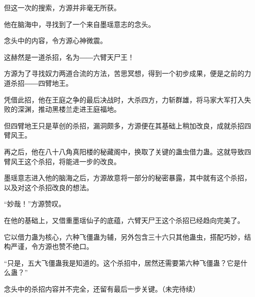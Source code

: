 \begin{this_body}
但这一次的搜索，方源并非毫无所获。

他在脑海中，寻找到了一个来自墨瑶意志的念头。

念头中的内容，令方源心神微震。

这赫然是一道杀招，名为――六臂天尸王！

方源为了寻找奴力两道合流的方法，苦思冥想，得到一个初步成果，便是之前的力道杀招――四臂地王。

凭借此招，他在王庭之争的最后决战时，大杀四方，力斩群雄，将马家大军打入失败的深渊，推动黑楼兰走进王庭福地。

但四臂地王只是草创的杀招，漏洞颇多，方源便在其基础上稍加改良，成就杀招四臂风王。

再之后，他在八十八角真阳楼的秘藏阁中，换取了关键的蛊虫借力蛊。这就导致四臂风王这个杀招，将能进一步的改良。

墨瑶意志进入他的脑海之后，方源故意将一部分的秘密暴露，其中就有这个杀招，以及对这个杀招改良的想法。

“妙哉！”方源赞叹。

在他的基础上，又借重墨瑶仙子的底蕴，六臂天尸王这个杀招已经趋向完美了。

它以借力蛊为核心，六种飞僵蛊为辅，另外包含三十六只其他蛊虫，搭配巧妙，结构严谨，令方源也赞不绝口。

“只是，五大飞僵蛊我是知道的。这个杀招中，居然还需要第六种飞僵蛊？它是什么蛊？”

念头中的杀招内容并不完全，还留有最后一步关键。（未完待续）

\end{this_body}

